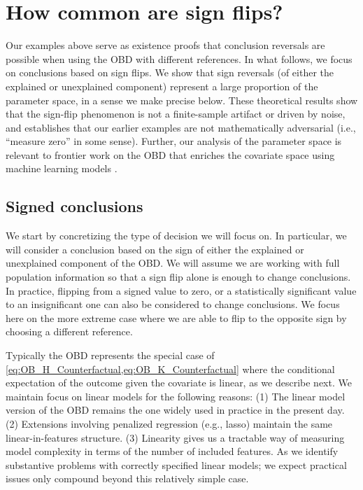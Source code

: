 \section{How common are sign flips?} 
\label{sec:signflips}

Our examples above serve as existence proofs that conclusion reversals are possible when using the OBD with different references.
In what follows, we focus on conclusions based on sign flips.
We show that sign reversals (of either the explained or unexplained component) represent a large proportion of the parameter space, in a sense we make precise below.
These theoretical results show that the sign-flip phenomenon is not a finite-sample artifact or driven by noise, and establishes that our earlier examples are not mathematically adversarial (i.e., ``measure zero'' in some sense).
Further, our analysis of the parameter space is relevant to frontier work on the OBD that enriches the covariate space using machine learning models \citep{bach2024heterogeneity,quintero2025,flachaire2025decomposing}.

\subsection{Signed conclusions}
\label{sec:sign_flip_characterizations}

We start by concretizing the type of decision we will focus on. 
In particular, we will consider a conclusion based on the sign of either the explained or unexplained component of the OBD.
We will assume we are working with full population information so that a sign flip alone is enough to change conclusions.
In practice, flipping from a signed value to zero, or a statistically significant value to an insignificant one can also be considered to change conclusions. 
We focus here on the more
extreme case where we are able to flip to the opposite sign by choosing a different reference.

Typically the OBD represents the special case of \cref{eq:OB_H_Counterfactual,eq:OB_K_Counterfactual} 
where the conditional expectation of the outcome given the covariate is linear, as we describe next.
We maintain focus on linear models for the following reasons:
(1) The linear model version of the OBD remains the one widely used in practice in the present day.
(2) Extensions involving penalized regression (e.g., lasso) maintain the same linear-in-features structure.
(3) Linearity gives us a tractable way of measuring model complexity in terms of the number of included features.
As we identify substantive problems with correctly specified linear models; we expect practical issues only compound beyond this relatively simple case.

